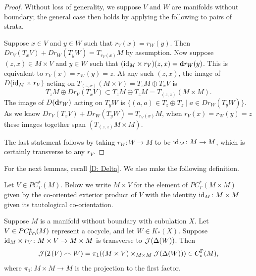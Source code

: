 \begin{proof}
	Without loss of generality, we suppose $V$ and $W$ are manifolds without boundary; the general case then holds by applying the following to pairs of strata.

	Suppose $x \in V$ and $y \in W$ such that $r_V(x) = r_W(y)$.
	Then $Dr_V(T_xV)+Dr_W(T_yW) = T_{r_V(x)}M$ by assumption.
	Now suppose $(z,x) \in M \times V$ and $y \in W$ such that $(\mathrm{id}_M \times r_V) (z,x) = \mathbf{d} r_W(y)$.
	This is equivalent to $r_V(x) = r_W(y) = z$.
	At any such $(z,x)$, the image of $D(\mathrm{id}_M \times r_V)$ acting on $T_{(z,x)}(M \times V) = T_zM \oplus T_xV$ is $$T_zM \oplus Dr_V(T_xV) \subset T_zM \oplus T_zM = T_{(z,z)}(M \times M).$$
	The image of $D(\mathbf{d} r_W)$ acting on $T_yW$ is $\{(a,a) \in T_z \oplus T_z \mid a \in Dr_W(T_yW)\}$.
	As we know $Dr_V(T_xV)+Dr_W(T_yW) = T_{r_V(x)}M$, when $r_V(x) = r_W(y) = z$ these images together span $(T_{(z,z)}M \times M)$.

	The last statement follows by taking $r_W \colon W \to M$ to be $\mathrm{id}_M \colon M \to M$, which is certainly transverse to any $r_V$.
\end{proof}

For the next lemmas, recall \cref{D: Delta}.
We also make the following definition.

\begin{definition}
	Let $V \in PC^*_\Gamma(M)$.
	Below we write $M \times V$ for the element of $PC^*_\Gamma(M \times M)$ given by the co-oriented exterior product of $V$ with the identity $\mathrm{id}_M \colon M \times M$ given its tautological co-orientation.
\end{definition}

\begin{lemma}\label{L: image of cubical cap}
	Suppose $M$ is a manifold without boundary with cubulation $X$.
	Let $V \in PC^*_{\Gamma\pitchfork}(M)$ represent a cocycle, and let $W \in K_*(X)$.
	Suppose $\mathrm{id}_M \times r_V \colon M \times V \to M \times M$ is transverse to $\mathcal{J}(\Delta(W))$.
	Then $$\mathcal{J}(\mathcal{I}(V)\frown W) = \pi_1( (M \times V)\times_{M \times M}\mathcal{J}(\Delta(W))) \in C_*^\Gamma(M),$$
	where $\pi_1 \colon M \times M \to M$ is the projection to the first factor.
\end{lemma}

